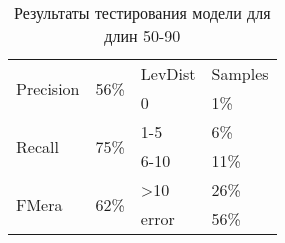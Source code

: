 \begin{table}[h]
\centering
\begin{tabular}{|p{2cm}|p{2cm}||p{2cm}|p{2cm}|}
\hline
\multirow{2}{*}{Precision} & \multirow{2}{*}{56\%} & LevDist & Samples \\ \cline{3-4} 
 &  & 0 & 1\% \\ \hline
\multirow{2}{*}{Recall} & \multirow{2}{*}{75\%} & 1-5 & 6\% \\ \cline{3-4} 
 &  & 6-10 & 11\% \\ \hline
\multirow{2}{*}{FMera} & \multirow{2}{*}{62\%} & \textgreater{}10 & 26\% \\ \cline{3-4} 
 &  & error &56\% \\ \hline
\end{tabular}
\caption{Результаты тестирования модели для длин 50-90}
\label{table3}
\end{table}